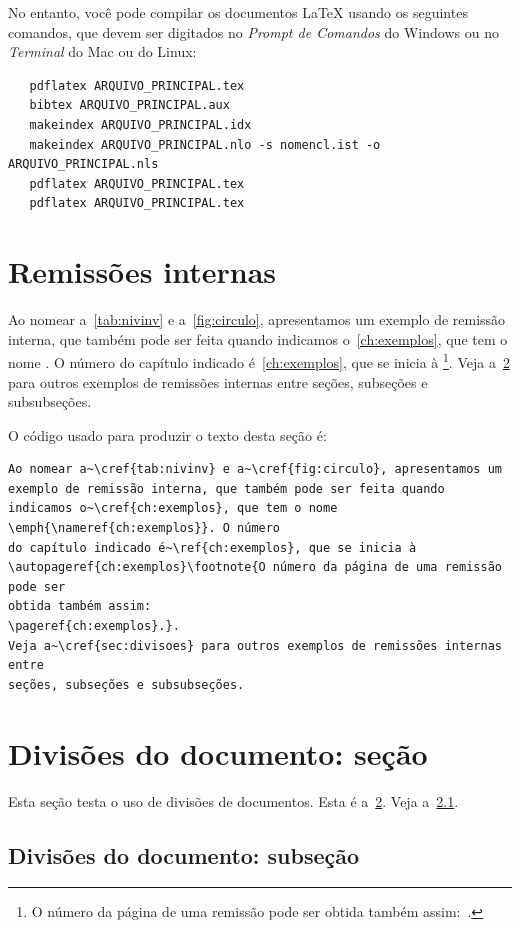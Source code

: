 No entanto, você pode compilar os documentos \LaTeX{} usando os seguintes
comandos, que devem ser digitados no \emph{Prompt de Comandos} do Windows ou no
\emph{Terminal} do Mac ou do Linux:

\begin{verbatim}
   pdflatex ARQUIVO_PRINCIPAL.tex
   bibtex ARQUIVO_PRINCIPAL.aux
   makeindex ARQUIVO_PRINCIPAL.idx
   makeindex ARQUIVO_PRINCIPAL.nlo -s nomencl.ist -o ARQUIVO_PRINCIPAL.nls
   pdflatex ARQUIVO_PRINCIPAL.tex
   pdflatex ARQUIVO_PRINCIPAL.tex
\end{verbatim}

\section{Remissões internas}

Ao nomear a~\cref{tab:nivinv} e a~\cref{fig:circulo}, apresentamos um
exemplo de remissão interna, que também pode ser feita quando indicamos o~\cref{ch:exemplos}, que tem o nome \emph{}. O número
do capítulo indicado é~\ref{ch:exemplos}, que se inicia à
\footnote{O número da página de uma remissão pode ser
	obtida também assim:~\pageref{ch:exemplos}.}.
Veja a~\cref{sec:divisoes} para outros exemplos de remissões internas entre
seções, subseções e subsubseções.

O código usado para produzir o texto desta seção é:

\begin{verbatim}
Ao nomear a~\cref{tab:nivinv} e a~\cref{fig:circulo}, apresentamos um
exemplo de remissão interna, que também pode ser feita quando indicamos o~\cref{ch:exemplos}, que tem o nome \emph{\nameref{ch:exemplos}}. O número
do capítulo indicado é~\ref{ch:exemplos}, que se inicia à
\autopageref{ch:exemplos}\footnote{O número da página de uma remissão pode ser
obtida também assim:
\pageref{ch:exemplos}.}.
Veja a~\cref{sec:divisoes} para outros exemplos de remissões internas entre
seções, subseções e subsubseções.
\end{verbatim}

\section{Divisões do documento:
  seção}%
\label{sec:divisoes}

Esta seção testa o uso de divisões de documentos. Esta é a~\cref{sec:divisoes}. Veja a~\cref{subsec:divisoes}.

\subsection{Divisões do documento:
	subseção}%
\label{subsec:divisoes}

